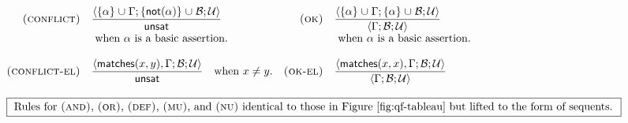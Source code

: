 \begin{figure*}
$$\begin{array}{rlrlrrr}
\prule{conflict}                & \pruleun{\sequent{\{ \alpha \} \union \Gamma; \{ \fnot{\alpha} \} \union \Basic; \Universals}}
                                          { \unsat }
                                &
\prule{ok}                      & \pruleun{\sequent{\{ \alpha \} \union \Gamma; \{ \alpha \} \union \Basic; \Universals}}
                                          {\sequent{        \Gamma; \Basic; \Universals}}
\\
                                & \text{ when $\alpha$ is a basic assertion.}
                                &
                                & \text{ when $\alpha$ is a basic assertion.}
\\\\
\prule{conflict-el}             & \pruleun{\sequent{\matches{x}{y}, \Gamma; \Basic; \Universals}}
                                          { \unsat }
                                  \quad \text{when $x \neq y$.}
                                &
\prule{ok-el}                   & \pruleun{\sequent{\matches{x}{x}, \Gamma; \Basic; \Universals}}
                                          {\sequent{                \Gamma; \Basic; \Universals}} \\
\hideinappendix{ \\ \multicolumn{4}{l}{\text{\fbox{
Rules for \prule{and}, \prule{or}, \prule{def}, \prule{mu}, and \prule{nu}
identical to those in Figure~\ref{fig:qf-tableau} but lifted to the form of sequents.
}}}\\\\}
\hideunlessappendix{
\prule{and}                     & \unsatruleun{\sequent{ \matches{z}{\phi} \land \matches{w}{\psi},   \Gamma; \Basic; \Universals}}
                                              {\sequent{ \matches{z}{\phi}, \matches{w}{\psi},  \Gamma; \Basic; \Universals}}
                                &
\prule{or}                      & \satrulebin{\sequent{ \matches{z}{\phi} \lor \matches{w}{\psi}, \Gamma; \Basic; \Universals}}
                                             {\sequent{ \matches{z}{\phi}, \Gamma; \Basic; \Universals}}
                                             {\sequent{ \matches{w}{\psi}, \Gamma; \Basic; \Universals}}
\\
\prule{def}                     & \pruleun{\sequent{ \matches{z}{\kappa X . \phi(X)}, \Gamma; \Basic; \Universals}}
                                          {\sequent{ \matches{z}{D}, \Gamma; \Basic; \Universals}}
}
\end{array}$$
\end{figure*}
